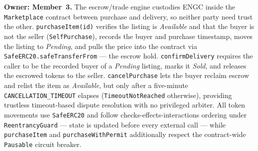\textbf{Owner: Member~3.} The escrow/trade engine custodies ENGC inside the \texttt{Marketplace} contract between purchase and delivery, so neither party need trust the other. \texttt{purchaseItem(id)} verifies the listing is \emph{Available} and that the buyer is not the seller (\texttt{SelfPurchase}), records the buyer and purchase timestamp, moves the listing to \emph{Pending}, and pulls the price into the contract via \texttt{SafeERC20.safeTransferFrom} --- the escrow hold. \texttt{confirmDelivery} requires the caller to be the recorded buyer of a \emph{Pending} listing, marks it \emph{Sold}, and releases the escrowed tokens to the seller. \texttt{cancelPurchase} lets the buyer reclaim escrow and relist the item as \emph{Available}, but only after a five-minute \texttt{CANCELLATION\_TIMEOUT} elapses (\texttt{TimeoutNotReached} otherwise), providing trustless timeout-based dispute resolution with no privileged arbiter. All token movements use \texttt{SafeERC20} and follow checks-effects-interactions ordering under \texttt{ReentrancyGuard} --- state is updated before every external call --- while \texttt{purchaseItem} and \texttt{purchaseWithPermit} additionally respect the contract-wide \texttt{Pausable} circuit breaker.
